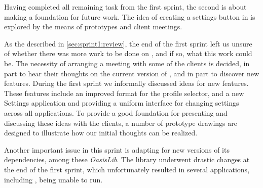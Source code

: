 Having completed all remaining task from the first sprint, the second is about making a foundation for future work.
The idea of creating a settings button in \launcher is explored by the means of prototypes and client meetings.

As the described in \cref{sec:sprint1:review}, the end of the first sprint left us unsure of whether there was more work to be done on \launcher, and if so, what this work could be. 
The necessity of arranging a meeting with some of the clients is decided, in part to hear their thoughts on the current version of \launcher, and in part to discover new features.
During the first sprint we informally discussed ideas for new features.
These features include an improved format for the profile selector, and a new Settings application and providing a uniform interface for changing settings across all applications. 
To provide a good foundation for presenting and discussing these ideas with the clients, a number of prototype drawings are designed to illustrate how our initial thoughts can be realized.

Another important issue in this sprint is adapting \launcher for new versions of its dependencies, among these \textit{OasisLib}.
The library underwent drastic changes at the end of the first sprint, which unfortunately resulted in several applications, including \launcher, being unable to run.